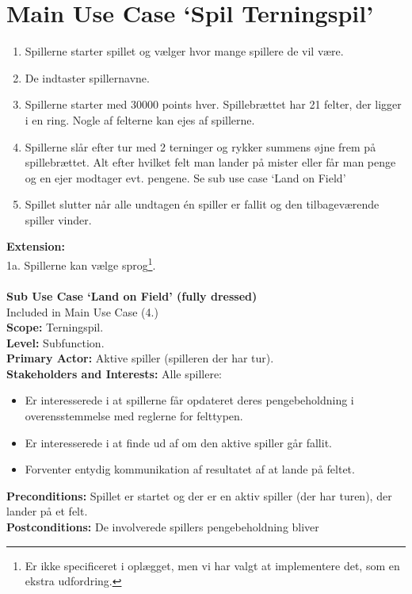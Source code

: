 \section*{Main Use Case ‘Spil Terningspil’}
\begin{enumerate}
  \item Spillerne starter spillet og vælger hvor mange spillere de vil være.
  \item De indtaster spillernavne.
  \item Spillerne starter med 30000 points hver. Spillebrættet har 21 felter,
  der ligger i en ring. Nogle af felterne kan ejes af spillerne.
  \item Spillerne slår efter tur med 2 terninger og rykker summens øjne frem på
  spillebrættet. Alt efter hvilket felt man lander på mister eller får man penge
  og en ejer modtager evt. pengene. Se sub use case ‘Land on Field’
  \item Spillet slutter når alle undtagen én spiller er fallit og den
  tilbageværende spiller vinder.
\end{enumerate}
\textbf{Extension:}\\
1a. Spillerne kan vælge sprog\footnote{Er ikke specificeret i oplægget, men vi
har valgt at implementere det, som en ekstra udfordring.}.\\
\\
\textbf{\large Sub Use Case ‘Land on Field’ (fully dressed)}\\
Included in Main Use Case (4.)\\
\textbf{Scope:} Terningspil.\\
\textbf{Level:} Subfunction.\\
\textbf{Primary Actor:} Aktive spiller (spilleren der har tur).\\
\textbf{Stakeholders and Interests:} Alle spillere:
\begin{itemize}
  \item Er interesserede i at spillerne får opdateret deres pengebeholdning i
  overensstemmelse med reglerne for felttypen.
  \item Er interesserede i at finde ud af om den aktive spiller går fallit.
  \item Forventer entydig kommunikation af resultatet af at lande på feltet.
\end{itemize}
\textbf{Preconditions:} Spillet er startet og der er en aktiv spiller (der har
turen), der lander på et felt.\\
\textbf{Postconditions:} De involverede spillers pengebeholdning bliver
